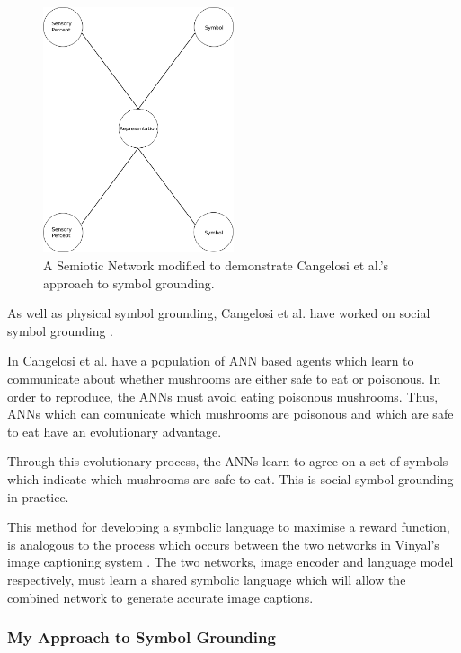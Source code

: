 \begin{figure}
\centering
\includegraphics[width=0.5\textwidth]{Figs/litReview/semioticNetPercept.png}
\caption{A Semiotic Network modified to demonstrate Cangelosi et al.'s approach to symbol grounding.}
\label{fig:percNet}

\end{figure}


As well as physical symbol grounding, Cangelosi et al. have worked on social symbol grounding \cite{cangelosi2001adaptive, cangelosi2002symbol, cangelosi1998emergence, horst2019object, cangelosi2018speech, cangelosi2008italk, broz2014italk}.

In \cite{cangelosi1998emergence} Cangelosi et al. have a population of \ac{ANN} based agents which learn to communicate about whether mushrooms are either safe to eat or poisonous. In order to reproduce, the \acp{ANN} must avoid eating poisonous mushrooms. Thus, \acp{ANN} which can comunicate which mushrooms are poisonous and which are safe to eat have an evolutionary advantage. 

Through this evolutionary process, the \acp{ANN} learn to agree on a set of symbols which indicate which mushrooms are safe to eat. This is social symbol grounding in practice. 

This method for developing a symbolic language to maximise a reward function, is analogous to the process which occurs between the two networks in Vinyal's image captioning system \cite{vinyals2015show}.  The two networks, image encoder and language model respectively, must learn a shared symbolic language which will allow the combined network to generate accurate image captions.


\subsubsection{My Approach to Symbol Grounding}


